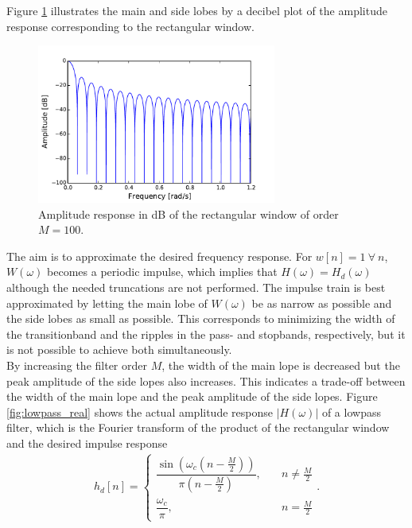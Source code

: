 Figure \ref{fig:rect_db} illustrates the main and side lobes by a decibel plot of the amplitude response corresponding to the rectangular window.

\begin{figure}[H]
\centering
\includegraphics[width=0.7\textwidth]{figures/dbplots/rect.pdf}
\caption{Amplitude response in dB of the rectangular window of order $M=100$.}
\label{fig:rect_db}
\end{figure}

%
The aim is to approximate the desired frequency response. For $w[n]=1 \ \forall \ n$, $W(\omega)$ becomes a periodic impulse, which implies that $H(\omega) = H_d(\omega)$ although the needed truncations are not performed. The impulse train is best approximated by letting the main lobe of $W(\omega)$ be as narrow as possible and the side lobes as small as possible. This corresponds to minimizing the width of the transitionband and the ripples in the pass- and stopbands, respectively, but it is not possible to achieve both simultaneously. \\
By increasing the filter order $M$, the width of the main lope is decreased but the peak amplitude of the side lopes also increases. This indicates a trade-off between the width of the main lope and the peak amplitude of the side lopes. Figure \ref{fig:lowpass_real} shows the actual amplitude response $|H(\omega)|$ of a lowpass filter, which is the Fourier transform of the product of the rectangular window and the desired impulse response
\begin{align*}
h_d[n] =
\begin{cases}
\dfrac{\sin\left(\omega_c\left(n - \frac{M}{2}\right)\right)}{\pi\left(n-\frac{M}{2}\right)}, \quad &n \neq \frac{M}{2} \\
\dfrac{\omega_c}{\pi}, \quad &n = \frac{M}{2}
\end{cases}.
\end{align*}

